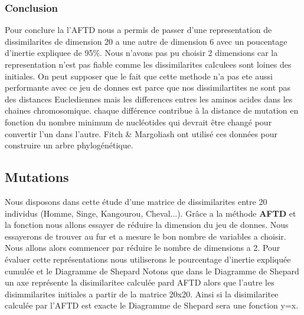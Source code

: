 \documentclass[10pt]{article}
\begin{document}
	\subsubsection{Conclusion}
	Pour conclure la l'AFTD nous a permis de passer d'une representation de dissimilarites de dimension 20 a une autre de dimension 6 avec un poucentage d'inertie expliquee de 95\%. Nous n'avons pas pu choisir 2 dimensions car la representation n'est pas fiable comme les dissimilarites calculees sont loines des initiales. On peut supposer que le fait que cette methode n'a pas ete aussi performante avec ce jeu de donnes est parce que nos dissimilartites ne sont pas des  distances Euclediennes mais les differences entres les aminos acides dans les chaines chromosomique. chaque différence contribue à la distance de mutation en fonction du nombre minimum de nucléotides qui devrait être changé pour convertir l'un dans l'autre. Fitch \& Margoliash ont utilisé ces données pour construire un arbre phylogénétique.
	

	\subsection{Mutations}
	Nous disposons dans cette étude  d'une matrice de dissimilarites entre 20 individus (Homme, Singe, Kangourou, Cheval...). Grâce a la méthode \textbf{AFTD} et la fonction nous allons essayer de réduire la dimension du jeu de donnes. Nous essayerons de trouver au fur et a mesure le bon nombre de variables a choisir. Nous allons alors commencer par réduire le nombre de dimensions a 2. Pour évaluer cette représentations nous utiliserons le pourcentage d'inertie  expliquée cumulée et le  Diagramme de Shepard  Notons que dans le Diagramme de Shepard un axe représente la disimilaritee calculée pard AFTD alors que l'autre les disimmilarites initiales a partir de la matrice 20x20. Ainsi si la disimilaritee calculée par l'AFTD est exacte le Diagramme de Shepard sera une fonction y=x.
	
\end{document}
